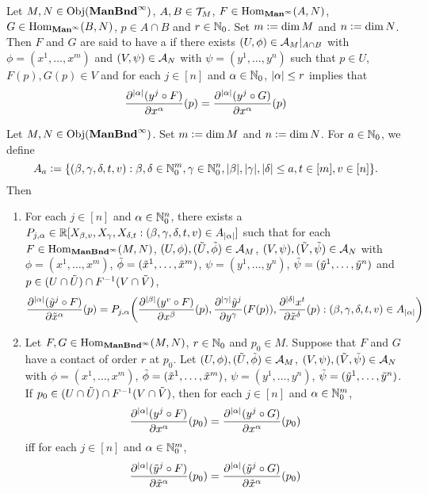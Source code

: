 \documentclass{book}
\begin{document}
\begin{defn}
	Let $M, N \in \operatorname{Obj}(\operatorname*{\text{\textbf{ManBnd}}^{\infty}})$, $A, B \in \mathcal{T}_M$, $F \in \operatorname{Hom}_{\operatorname*{\text{\textbf{Man}}^{\infty}}}(A, N)$, $G \in \operatorname{Hom}_{\operatorname*{\text{\textbf{Man}}^{\infty}}}(B, N)$, $p \in A \cap B$ and $r \in \mathbb{N}_0$. Set $m \vcentcolon= \dim M$ and $n \vcentcolon= \dim N$. Then $F$ and $G$ are said to have a  if there exists $(U, \phi) \in \mathcal{A}_M|_{A \cap B}$ with $\phi = (x^1, \ldots, x^m)$ and $(V, \psi) \in \mathcal{A}_N$ with $\psi = (y^1, \ldots, y^n)$ such that $p \in U$, $F(p), G(p) \in V$ and for each $j \in [n]$ and $\alpha \in \mathbb{N}_0$, $|\alpha| \leq r$ implies that
	$$\frac{\partial^{|\alpha|} (y^j \circ F)}{\partial x^{\alpha}}(p) =  \frac{\partial^{|\alpha|} (y^j \circ G)}{\partial x^{\alpha}}(p)$$
\end{defn}

\begin{ex}
	Let $M, N \in \operatorname{Obj}(\operatorname*{\text{\textbf{ManBnd}}^{\infty}})$. Set $m \vcentcolon= \dim M$ and $n \vcentcolon= \dim N$. For $a \in \mathbb{N}_0$, we define 
	$$A_a \vcentcolon= \{(\beta, \gamma, \delta, t, v) : \beta, \delta \in \mathbb{N}_0^m, \gamma \in \mathbb{N}_0^n, |\beta|, |\gamma|, |\delta| \leq a, t \in [m], v \in [n]\}.$$ 
	Then
	\begin{enumerate}
		\item For each $j \in [n]$ and $\alpha \in \mathbb{N}_0^n$, there exists a $P_{j, \alpha} \in \mathbb{R}[X_{\beta, v}, X_{\gamma}, X_{\delta, t}: (\beta, \gamma, \delta, t, v) \in A_{|\alpha|}]$ such that for each $F \in \operatorname{Hom}_{\operatorname*{\text{\textbf{ManBnd}}^{\infty}}}(M, N)$, $(U, \phi), (\tilde{U}, \tilde{\phi}) \in \mathcal{A}_M$, $(V, \psi), (\tilde{V}, \tilde{\psi}) \in \mathcal{A}_N$ with $\phi = (x^1, \ldots, x^m)$, $\tilde{\phi} = (\tilde{x}^1, \ldots, \tilde{x}^m)$, $\psi = (y^1, \ldots, y^n)$, $\tilde{\psi} = (\tilde{y}^1, \ldots, \tilde{y}^n)$ and $p \in (U \cap \tilde{U}) \cap F^{-1}(V \cap \tilde{V})$,
		$$\frac{\partial^{|\alpha|} (\tilde{y}^j \circ F)}{\partial \tilde{x}^{\alpha}}(p) = P_{j, \alpha}\bigg( \frac{\partial^{|\beta|} (y^{v} \circ F)}{\partial x^{\beta}}(p),  \frac{\partial^{|\gamma|} \tilde{y}^j}{\partial y^{\gamma}} (F(p)), \frac{\partial^{|\delta|} x^t}{\partial \tilde{x}^{\delta}}(p) : (\beta, \gamma, \delta, t, v) \in A_{|\alpha|} \bigg)$$
		\item Let $F, G \in \operatorname{Hom}_{\operatorname*{\text{\textbf{ManBnd}}^{\infty}}}(M, N)$, $r \in \mathbb{N}_0$ and $p_0 \in M$. Suppose that $F$ and $G$ have a contact of order $r$ at $p_0$. Let $(U, \phi), (\tilde{U}, \tilde{\phi}) \in \mathcal{A}_M$, $(V, \psi), (\tilde{V}, \tilde{\psi}) \in \mathcal{A}_N$ with $\phi = (x^1, \ldots, x^m)$, $\tilde{\phi} = (\tilde{x}^1, \ldots, \tilde{x}^m)$, $\psi = (y^1, \ldots, y^n)$, $\tilde{\psi} = (\tilde{y}^1, \ldots, \tilde{y}^n)$. If $p_0 \in (U \cap \tilde{U}) \cap F^{-1}(V \cap \tilde{V})$, then 
		for each  $j \in [n]$ and $\alpha \in \mathbb{N}_0^m$,
		$$\frac{\partial^{|\alpha|} (y^j \circ F)}{\partial x^{\alpha}}(p_0) =  \frac{\partial^{|\alpha|} (y^j \circ G)}{\partial x^{\alpha}}(p_0)$$ 
		iff for each $j \in [n]$ and $\alpha \in \mathbb{N}_0^m$,
		$$\frac{\partial^{|\alpha|} (\tilde{y}^j \circ F)}{\partial \tilde{x}^{\alpha}}(p_0) =  \frac{\partial^{|\alpha|} (\tilde{y}^j \circ G)}{\partial \tilde{x}^{\alpha}}(p_0)$$
	\end{enumerate}
\end{ex}
\end{document}
